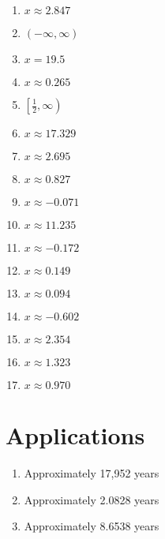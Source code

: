 \begin{multicols}{2}
\begin{enumerate}
	\item $x \approx 2.847$
	\item $(-\infty, \infty)$
	\item $x = 19.5$
	\item $x \approx 0.265$
	\item $\left[\frac{1}{2}, \infty\right)$
	\item $x \approx 17.329$
	\item $x \approx 2.695$
    \item $x \approx 0.827$
    \item $x \approx -0.071$
    \item $x \approx 11.235$
    \item $x \approx -0.172$
    \item $x \approx 0.149$
    \item $x \approx 0.094$
    \item $x \approx -0.602$
    \item $x \approx 2.354$
    \item $x \approx 1.323$
    \item $x \approx 0.970$
\end{enumerate}
\end{multicols}

\section*{Applications}

\begin{enumerate}
	\item Approximately 17,952 years
	\item Approximately 2.0828 years
    \item Approximately 8.6538 years
\end{enumerate}